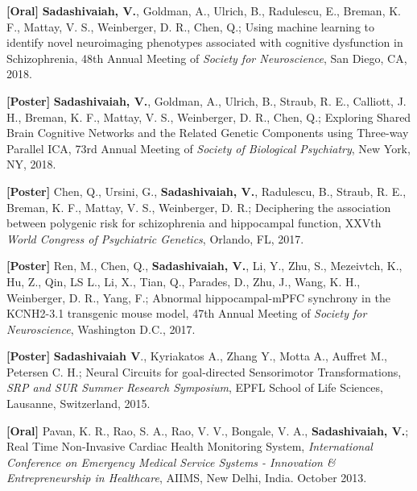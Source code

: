 \documentclass{resume}
\begin{document}
\begin{presentations}
\item \textbf{[Oral]} \textbf{Sadashivaiah, V.}, Goldman, A., Ulrich, B., Radulescu, E., Breman, K. F., Mattay, V. S., Weinberger, D. R., Chen, Q.; Using machine learning to identify novel neuroimaging phenotypes associated with cognitive dysfunction in Schizophrenia, 48th Annual Meeting of \textit{Society for Neuroscience}, San Diego, CA, 2018.

\item \textbf{[Poster]} \textbf{Sadashivaiah, V.}, Goldman, A., Ulrich, B., Straub, R. E., Calliott, J. H., Breman, K. F., Mattay, V. S., Weinberger, D. R., Chen, Q.; Exploring Shared Brain Cognitive Networks and the Related Genetic Components using Three-way Parallel ICA, 73rd Annual Meeting of \textit{Society of Biological Psychiatry}, New York, NY, 2018.

\item \textbf{[Poster]} Chen, Q., Ursini, G., \textbf{Sadashivaiah, V.}, Radulescu, B., Straub, R. E., Breman, K. F., Mattay, V. S., Weinberger, D. R.; Deciphering the association between polygenic risk for schizophrenia and hippocampal function, XXVth \textit{World Congress of Psychiatric Genetics}, Orlando, FL, 2017.

\item \textbf{[Poster]} Ren, M., Chen, Q., \textbf{Sadashivaiah, V.}, Li, Y., Zhu, S., Mezeivtch, K., Hu, Z.,  Qin, LS L., Li, X., Tian, Q., Parades, D., Zhu, J., Wang, K. H., Weinberger, D. R., Yang, F.; Abnormal hippocampal-mPFC synchrony in the KCNH2-3.1 transgenic mouse model, 47th Annual Meeting of \textit{Society for Neuroscience}, Washington D.C., 2017.

\item \textbf{[Poster]} \textbf{Sadashivaiah V}.,  Kyriakatos A.,  Zhang Y.,  Motta A.,  Auffret M.,  Petersen C. H.; Neural Circuits for goal-directed Sensorimotor Transformations, \textit{SRP and SUR Summer Research Symposium}, EPFL School of Life Sciences, Lausanne, Switzerland, 2015.

\item \textbf{[Oral]} Pavan, K. R., Rao, S. A., Rao, V. V., Bongale, V. A., \textbf{Sadashivaiah, V.}; Real Time Non-Invasive Cardiac Health Monitoring System,  \textit{International Conference on Emergency Medical Service Systems - Innovation \& Entrepreneurship in Healthcare}, AIIMS, New Delhi, India. October 2013.
\end{presentations}
\end{document}
